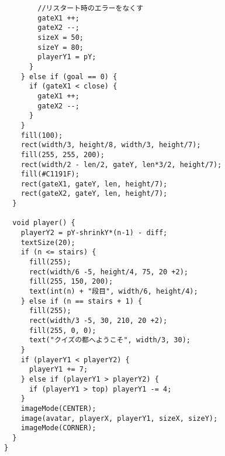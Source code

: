 \documentclass{jsarticle}
\begin{document}
\begin{tiny}
\begin{lstlisting}
        //リスタート時のエラーをなくす
        gateX1 ++;
        gateX2 --;
        sizeX = 50;
        sizeY = 80;
        playerY1 = pY;
      }
    } else if (goal == 0) {
      if (gateX1 < close) {
        gateX1 ++;
        gateX2 --;
      }
    }
    fill(100);
    rect(width/3, height/8, width/3, height/7);
    fill(255, 255, 200);
    rect(width/2 - len/2, gateY, len*3/2, height/7);
    fill(#C1191F);
    rect(gateX1, gateY, len, height/7);
    rect(gateX2, gateY, len, height/7);
  }

  void player() {
    playerY2 = pY-shrinkY*(n-1) - diff;
    textSize(20);
    if (n <= stairs) {
      fill(255);
      rect(width/6 -5, height/4, 75, 20 +2);
      fill(255, 150, 200);
      text(int(n) + "段目", width/6, height/4);
    } else if (n == stairs + 1) {
      fill(255);
      rect(width/3 -5, 30, 210, 20 +2);
      fill(255, 0, 0);
      text("クイズの都へようこそ", width/3, 30);
    }
    if (playerY1 < playerY2) {
      playerY1 += 7;
    } else if (playerY1 > playerY2) {
      if (playerY1 > top) playerY1 -= 4;
    }
    imageMode(CENTER);
    image(avatar, playerX, playerY1, sizeX, sizeY);
    imageMode(CORNER);
  }
}
  \end{lstlisting}
\end{tiny}
\end{document}
